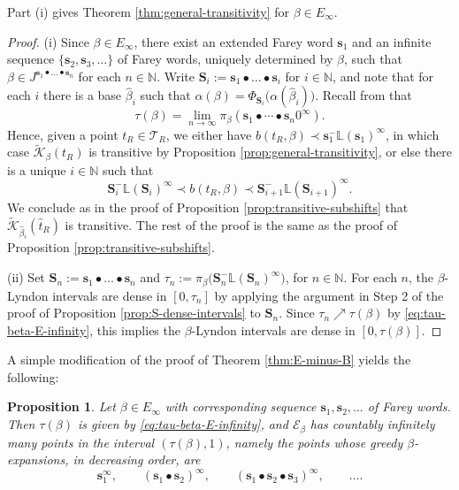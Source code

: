 \documentclass[11pt]{amsart}
\newtheorem{proposition}[theorem]{Proposition}
\theoremstyle{definition}
\theoremstyle{remark}
\numberwithin{equation}{section}
\newcommand{\N}{\ensuremath{\mathbb{N}}}
\renewcommand{\L}{\ensuremath{\mathbb{L}}}
\newcommand{\EE}{\mathscr{E}}
\newcommand{\Kt}{\widetilde{\mathcal{K}}}
\newcommand{\s}{ {\mathbf{s}}}
\newcommand{\cs}{ {\mathbf{S}}}
\newcommand{\f}{\infty}
\newcommand{\al}{\alpha}
\begin{document}
Part (i) gives Theorem \ref{thm:general-transitivity} for $\beta\in E_\f$.

\begin{proof}
(i) Since $\beta\in E_\f$, there {exist an extended Farey word $\s_1$ and an infinite sequence $\{\s_2,\s_3,\dots\}$} of Farey words, uniquely determined by $\beta$, such that $\beta\in J^{\s_1\bullet\dots\bullet\s_n}$ for each $n\in\N$. Write $\cs_i:=\s_1\bullet\dots\bullet\s_i$ for $i\in\N$, and note that for each $i$ there is a base $\hat{\beta}_i$ such that $\al(\beta)=\Phi_{\cs_i}\big(\al(\hat{\beta}_i)\big)$. Recall from \cite[Proposition 6.3]{Allaart-Kong-2021} that
\begin{equation} \label{eq:tau-beta-E-infinity}
\tau(\beta)=\lim_{n\to\f}\pi_\beta(\s_1\bullet\cdots\bullet\s_n 0^\f).
\end{equation}
Hence, given a point $t_R\in\mathcal{T}_R$, we either have $b(t_R,\beta)\prec \s_1^-\L(\s_1)^\f$, in which case $\Kt_\beta(t_R)$ is transitive by Proposition \ref{prop:general-transitivity}, or else there is a unique $i\in\N$ such that
\[
\cs_i^-\L(\cs_i)^\f\prec b(t_R,\beta) \prec \cs_{i+1}^-\L(\cs_{i+1})^\f.
\]
We conclude as in the proof of Proposition \ref{prop:transitive-subshifts} that $\Kt_{\hat\beta_i}(\hat{t}_R)$ is transitive. The rest of the proof is the same as the proof of Proposition \ref{prop:transitive-subshifts}.

(ii) {Set $\cs_n:=\s_1\bullet\dots\bullet\s_n$ and $\tau_n:=\pi_\beta\big(\cs_n^-\L(\cs_n)^\f\big)$, for $n\in\N$.
For each $n$, the $\beta$-Lyndon intervals are dense in $[0,\tau_n]$ by applying the argument in Step 2 of the proof of Proposition \ref{prop:S-dense-intervals} to $\cs_n$.} Since $\tau_n\nearrow \tau(\beta)$ {by \eqref{eq:tau-beta-E-infinity}}, this implies the $\beta$-Lyndon intervals are dense in $[0,\tau(\beta)]$.
\end{proof}

A simple modification of the proof of Theorem \ref{thm:E-minus-B} yields the following:

\begin{proposition} \label{prop:E-inf-bifurcation}
Let $\beta\in E_\f$ with corresponding sequence $\s_1,\s_2,\dots$ of Farey words. Then $\tau(\beta)$ is given by \eqref{eq:tau-beta-E-infinity},
and $\EE_\beta$ has countably infinitely many points in the interval $(\tau(\beta),1)$, namely the points whose greedy $\beta$-expansions, in decreasing order, are
\[
\s_1^\f, \qquad (\s_1\bullet \s_2)^\f, \qquad (\s_1\bullet \s_2\bullet \s_3)^\f,\qquad \dots.
\]
\end{proposition}
\end{document}
